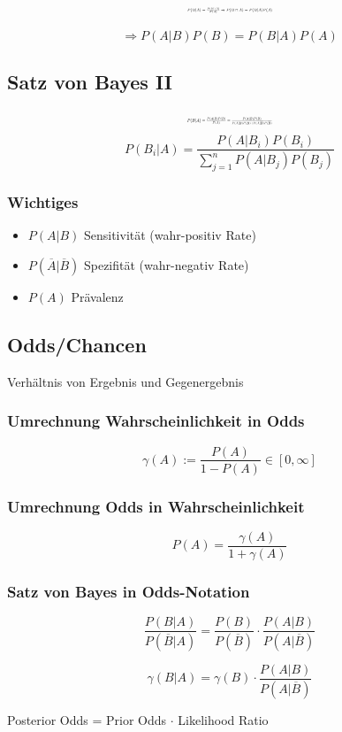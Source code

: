\documentclass[10pt,a4paper,landscape]{article}
\begin{document}
\begin{multicols}{4}
\[ \resizebox{0.2\textwidth}{!}{$
P(B|A)=\frac{P(B\cap A)}{P(A)} \Rightarrow P(B\cap A)=P(B|A)P(A)
$}
\]

\[
\Rightarrow P(A|B)P(B)=P(B|A)P(A)
\]

\subsection{Satz von Bayes II}
\[ \resizebox{0.2\textwidth}{!}{$
P(B|A)=\frac{P(A|B)P(B)}{P(A)}=\frac{P(A|B)P(B)}{P(A|B)P(B)+P(A|\overline{B})P(\overline{B})}
$}
\]
\[ 
P(B_i|A)=\frac{P(A|B_i)P(B_i)}{\sum_{j=1}^n P(A|B_j)P(B_j)}
\]

\subsubsection*{Wichtiges}
\begin{itemize}
\item $P(A|B)$ Sensitivität (wahr-positiv Rate)
\item $P(\overline{A}|\overline{B})$ Spezifität (wahr-negativ Rate)
\item $P(A)$ Prävalenz
\end{itemize}

\subsection{Odds/Chancen}
Verhältnis von Ergebnis und Gegenergebnis
\subsubsection{Umrechnung Wahrscheinlichkeit in Odds}
\[
\gamma (A):=\frac{P(A)}{1-P(A)}\in [0, \infty]
\]

\subsubsection{Umrechnung Odds in Wahrscheinlichkeit}
\[
P(A)=\frac{\gamma(A)}{1+\gamma(A)}
\]

\subsubsection{Satz von Bayes in Odds-Notation}
\[
\frac{P(B|A)}{P(\overline{B}|A)}=\frac{P(B)}{P(\overline{B})}\cdot \frac{P(A|B)}{P(A|\overline{B})}
\]

\[
\gamma(B|A)=\gamma(B) \cdot \frac{P(A|B)}{P(A|\overline{B})}
\]

\begin{center}
Posterior Odds = Prior Odds $\cdot$ Likelihood Ratio
\end{center}


\end{multicols}
\end{document}
